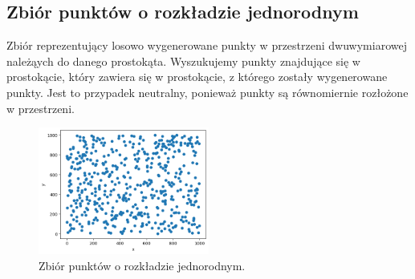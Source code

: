 \documentclass{lab}
\begin{document}
\subsection{Zbiór punktów o rozkładzie jednorodnym}
Zbiór reprezentujący losowo wygenerowane punkty w przestrzeni dwuwymiarowej należąych do danego prostokąta.
Wyszukujemy punkty znajdujące się w prostokącie, który zawiera się w prostokącie, z którego zostały wygenerowane punkty.
Jest to przypadek neutralny, ponieważ punkty są równomiernie rozłożone w przestrzeni.

\begin{figure}[H]
  \centering
  \includegraphics[width=0.5\textwidth]{resources/uniform.png}
  \caption{Zbiór punktów o rozkładzie jednorodnym.}
  \label{fig:uniform}
\end{figure}
\end{document}
